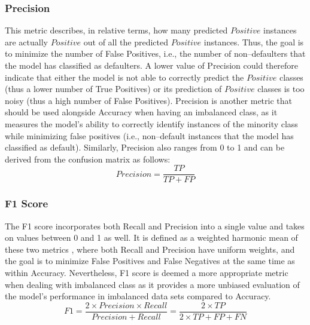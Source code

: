 \newpage
\subsubsection{Precision}
This metric describes, in relative terms, how many predicted $Positive$ instances are actually $Positive$ out of all the predicted $Positive$ instances. Thus, the goal is to minimize the number of False Positives, i.e., the number of non--defaulters that the model has classified as defaulters.
A lower value of Precision could therefore indicate that either the model is not able to correctly predict the $Positive$ classes (thus a lower number of True Positives) or its prediction of $Positive$ classes is too noisy (thus a high number of False Positives).
Precision is another metric that should be used alongside Accuracy when having an imbalanced class, as it measures the model's ability to correctly identify instances of the minority class while minimizing false positives (i.e., non--default instances that the model has classified as default).
Similarly, Precision also ranges from 0 to 1 and can be derived from the confusion matrix as follows:
\begin{equation}\label{eq}
     Precision = \frac{TP}{TP + FP}
\end{equation}
\subsubsection{F1 Score}
The F1 score incorporates both Recall and Precision into a single value and takes on values between 0 and 1 as well.
It is defined as a weighted harmonic mean of these two metrics \citep{brabec2020model}, where both Recall and Precision have uniform weights, and the goal is to minimize False Positives and False Negatives at the same time as within Accuracy.
Nevertheless, F1 score is deemed a more appropriate metric when dealing with imbalanced class as it provides a more unbiased evaluation of the model's performance in imbalanced data sets compared to Accuracy.
\begin{equation}\label{eq}
F1 = \frac{2 \times Precision \times Recall}{Precision + Recall} = \frac{2 \times TP}{2 \times TP + FP + FN}
\end{equation}


\newpage
